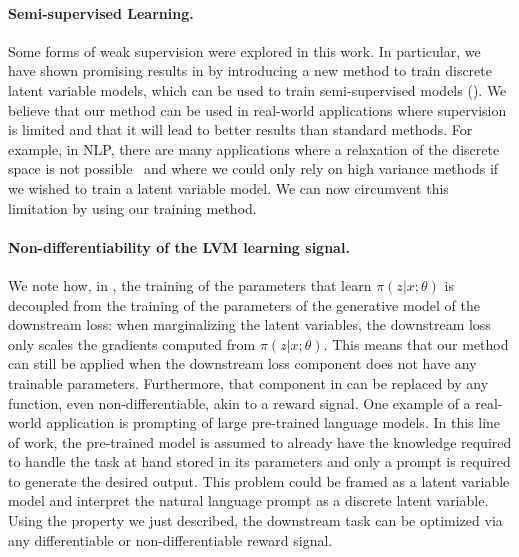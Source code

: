 \paragraph{Semi-supervised Learning.} Some forms of weak
supervision were explored in this work. In particular, we have shown
promising results in  by introducing a new
method to train discrete latent variable models, which can be used to
train semi-supervised models (). We believe that our
method can be used in real-world applications where supervision is
limited and that it will lead to better results than standard
methods. For example, in NLP, there are many applications where a
relaxation of the discrete space is not possible~\citep{Lee2019} and
where we could only rely on high variance methods if we wished to
train a latent variable model. We can now circumvent this limitation
by using our training method.

\paragraph{Non-differentiability of the LVM learning signal.} We note
how, in , the training of the parameters that learn
$\pi(z|x;\theta)$ is decoupled from the training of the parameters of
the generative model of the downstream loss: when marginalizing the
latent variables, the downstream loss only scales the gradients
computed from $\pi(z|x;\theta)$. This means that our method can still
be applied when the downstream loss component does not have any
trainable parameters. Furthermore, that component in 
can be replaced by any function, even non-differentiable, akin to a
reward signal. One example of a real-world application is prompting
of large pre-trained language models. In this line of work, the
pre-trained model is assumed to already have the knowledge required
to handle the task at hand stored in its parameters and only a prompt
is required to generate the desired output. This problem could be
framed as a latent variable model and interpret the natural language
prompt as a discrete latent variable. Using the property we just
described, the downstream task can be optimized via any
differentiable or non-differentiable reward signal.




